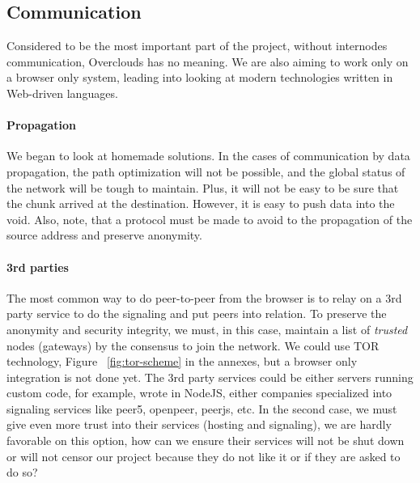 
\subsection{Communication}
Considered to be the most important part of the project, without internodes communication, Overclouds has no meaning. We are also aiming to work only on a browser only system, leading into looking at modern technologies written in Web-driven languages.

\paragraph{Propagation} We began to look at homemade solutions. In the cases of communication by data propagation, the path optimization will not be possible, and the global status of the network will be tough to maintain. Plus, it will not be easy to be sure that the chunk arrived at the destination. However, it is easy to push data into the void. Also, note, that a protocol must be made to avoid to the propagation of the source address and preserve anonymity.

\paragraph{3rd parties} The most common way to do peer-to-peer from the browser is to relay on a 3rd party service to do the signaling and put peers into relation. To preserve the anonymity and security integrity, we must, in this case, maintain a list of \textit{trusted} nodes (gateways) by the consensus to join the network. We could use TOR technology, Figure ~\ref{fig:tor-scheme} in the annexes, but a browser only integration is not done yet. The 3rd party services could be either servers running custom code, for example, wrote in NodeJS, either companies specialized into signaling services like peer5\cite{Peer52015Peer5}, openpeer\cite{Hookflash2014OpenPeer}, peerjs\cite{SwitchPeerJS}, etc. In the second case, we must give even more trust into their services (hosting and signaling), we are hardly favorable on this option, how can we ensure their services will not be shut down or will not censor our project because they do not like it or if they are asked to do so?

